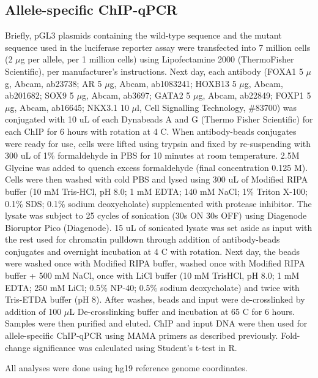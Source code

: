 \subsection{Allele-specific ChIP-qPCR}

Briefly, pGL3 plasmids containing the wild-type sequence and the mutant sequence used in the luciferase reporter assay were transfected into 7 million cells (2 $\mu$g per allele, per 1 million cells) using Lipofectamine 2000 (ThermoFisher Scientific), per manufacturer's instructions.
Next day, each antibody (FOXA1 5 $\mu$g, Abcam, ab23738; AR 5 $\mu$g, Abcam, ab1083241; HOXB13 5 $\mu$g, Abcam, ab201682; SOX9 5 $\mu$g, Abcam, ab3697; GATA2 5 $\mu$g, Abcam, ab22849; FOXP1 5 $\mu$g, Abcam, ab16645; NKX3.1 10 $\mu$l, Cell Signalling Technology, \#83700) was conjugated with 10 uL of each Dynabeads A and G (Thermo Fisher Scientific) for each ChIP for 6 hours with rotation at 4 \textdegree C.
When antibody-beads conjugates were ready for use, cells were lifted using trypsin and fixed by re-suspending with 300 uL of 1\% formaldehyde in PBS for 10 minutes at room temperature.
2.5M Glycine was added to quench excess formaldehyde (final concentration 0.125 M).
Cells were then washed with cold PBS and lysed using 300 uL of Modified RIPA buffer (10 mM Tris-HCl, pH 8.0; 1 mM EDTA; 140 mM NaCl; 1\% Triton X-100; 0.1\% SDS; 0.1\% sodium deoxycholate) supplemented with protease inhibitor.
The lysate was subject to 25 cycles of sonication (30s ON 30s OFF) using Diagenode Bioruptor Pico (Diagenode).
15 uL of sonicated lysate was set aside as input with the rest used for chromatin pulldown through addition of antibody-beads conjugates and overnight incubation at 4 \textdegree C with rotation.
Next day, the beads were washed once with Modified RIPA buffer, washed once with Modified RIPA buffer + 500 mM NaCl, once with LiCl buffer (10 mM TrisHCl, pH 8.0; 1 mM EDTA; 250 mM LiCl; 0.5\% NP-40; 0.5\% sodium deoxycholate) and twice with Tris-ETDA buffer (pH 8).
After washes, beads and input were de-crosslinked by addition of 100 $\mu$L De-crosslinking buffer and incubation at 65 \textdegree C for 6 hours.
Samples were then purified and eluted.
ChIP and input DNA were then used for allele-specific ChIP-qPCR using MAMA primers as described previously.
Fold-change significance was calculated using Student's t-test in R.

All analyses were done using hg19 reference genome coordinates.
